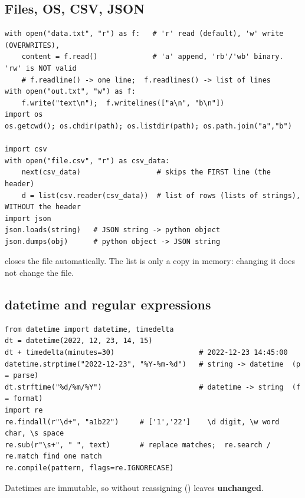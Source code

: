 \subsection{Files, OS, CSV, JSON}
\begin{codebox}
\begin{Verbatim}
with open("data.txt", "r") as f:   # 'r' read (default), 'w' write (OVERWRITES),
    content = f.read()             # 'a' append, 'rb'/'wb' binary.  'rw' is NOT valid
    # f.readline() -> one line;  f.readlines() -> list of lines
with open("out.txt", "w") as f:
    f.write("text\n");  f.writelines(["a\n", "b\n"])
import os
os.getcwd(); os.chdir(path); os.listdir(path); os.path.join("a","b")

import csv
with open("file.csv", "r") as csv_data:
    next(csv_data)                  # skips the FIRST line (the header)
    d = list(csv.reader(csv_data))  # list of rows (lists of strings), WITHOUT the header
import json
json.loads(string)   # JSON string -> python object
json.dumps(obj)      # python object -> JSON string
\end{Verbatim}
\end{codebox}
 closes the file automatically. The list  is only a copy in memory: changing it does not change the file.

\subsection{datetime and regular expressions}
\begin{codebox}
\begin{Verbatim}
from datetime import datetime, timedelta
dt = datetime(2022, 12, 23, 14, 15)
dt + timedelta(minutes=30)                    # 2022-12-23 14:45:00
datetime.strptime("2022-12-23", "%Y-%m-%d")   # string -> datetime  (p = parse)
dt.strftime("%d/%m/%Y")                       # datetime -> string  (f = format)
import re
re.findall(r"\d+", "a1b22")     # ['1','22']    \d digit, \w word char, \s space
re.sub(r"\s+", " ", text)       # replace matches;  re.search / re.match find one match
re.compile(pattern, flags=re.IGNORECASE)
\end{Verbatim}
\end{codebox}
Datetimes are immutable, so  without reassigning () leaves  \textbf{unchanged}.

